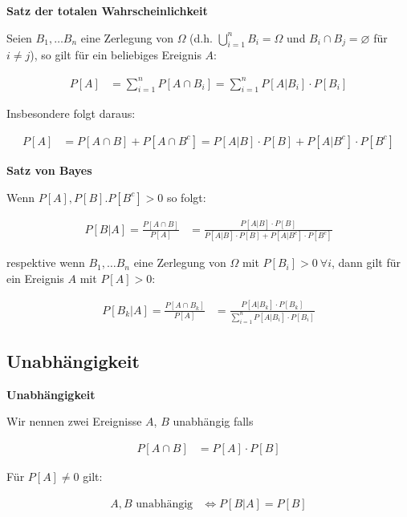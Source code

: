 \documentclass[25pt]{sciposter}
\newenvironment{method}[1]{\begin{mdframed}[backgroundcolor=blue!10,innertopmargin=15pt, innerbottommargin=15pt,nobreak=true]
		\textbf{#1 }
	}
	{ 
	\end{mdframed}
}
\newenvironment{thm}[1]{\begin{mdframed}[backgroundcolor=pink!20,innertopmargin=15pt, innerbottommargin=15pt, nobreak=true]
		\textbf{#1 }
	}
	{ 
	\end{mdframed}
}
\begin{document}
\begin{multicols}{3}
\begin{thm}{Satz der totalen Wahrscheinlichkeit}
	 Seien $B_1, \ldots B_n$ eine Zerlegung von $\Omega$ (d.h. $\bigcup_{i=1}^n B_i = \Omega$ und $B_i \cap B_j = \varnothing$ für $i\neq j$), so gilt für ein beliebiges Ereignis $A$:
	 
	 \begin{align*}
	 	P[A] &= \sum_{i=1}^{n} P[A\cap B_i] = \sum_{i=1}^{n} P[A|B_i]\cdot P[B_i]
	 \end{align*}
	 
	 Insbesondere folgt daraus:
	 
	 \begin{align*}
	 	P[A] &= P[A\cap B] + P[A \cap B^c] = P[A|B]\cdot P[B] + P[A|B^c]\cdot P[B^c]
	 \end{align*}
\end{thm}


\begin{thm}{Satz von Bayes}
	Wenn $P[A],P[B].P[B^c]> 0$ so folgt:
	
	\begin{align*}
		P[B|A] = \frac{P[A\cap B]}{P[A]} &= \frac{P[A|B]\cdot P[B]}{P[A|B]\cdot P[B] + P[A|B^c]\cdot P[B^c]}
	\end{align*}
	
	respektive wenn $B_1, \ldots B_n$ eine Zerlegung von $\Omega$ mit $P[B_i]>0 \  \forall i$, dann gilt für ein Ereignis $A$ mit $P[A]>0$:
	
	\begin{align*}
		P[B_k|A] = \frac{P[A\cap B_k]}{P[A]} &= \frac{P[A|B_k]\cdot P[B_k]}{\sum_{i=1}^{n} P[A|B_i] \cdot P[B_i] }
	\end{align*}
\end{thm}


\subsection*{Unabhängigkeit}

\begin{method}{Unabhängigkeit}
	Wir nennen zwei Ereignisse $A$, $B$ unabhängig falls
	
	\begin{align*}
		P[A\cap B] &= P[A] \cdot P[B]
	\end{align*}
	
	Für $P[A] \neq 0$ gilt:
	
	\begin{align*}
		\text{$A,B$ unabhängig} &\iff P[B|A] = P[B]
	\end{align*}
	

\end{method}
\end{multicols}
\end{document}
